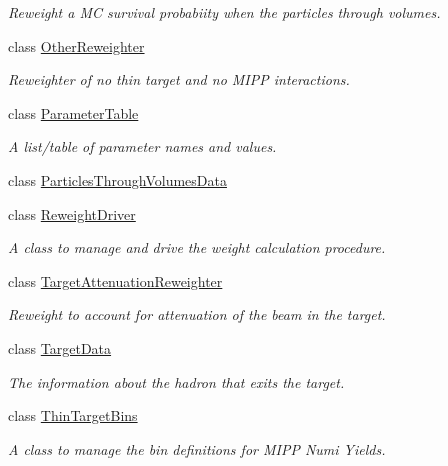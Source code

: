 \begin{DoxyCompactItemize}
\begin{DoxyCompactList}\small\item\em Reweight a M\-C survival probabiity when the particles through volumes. \end{DoxyCompactList}\item 
class \hyperlink{class_neutrino_flux_reweight_1_1_other_reweighter}{Other\-Reweighter}
\begin{DoxyCompactList}\small\item\em Reweighter of no thin target and no M\-I\-P\-P interactions. \end{DoxyCompactList}\item 
class \hyperlink{class_neutrino_flux_reweight_1_1_parameter_table}{Parameter\-Table}
\begin{DoxyCompactList}\small\item\em A list/table of parameter names and values. \end{DoxyCompactList}\item 
class \hyperlink{class_neutrino_flux_reweight_1_1_particles_through_volumes_data}{Particles\-Through\-Volumes\-Data}
\item 
class \hyperlink{class_neutrino_flux_reweight_1_1_reweight_driver}{Reweight\-Driver}
\begin{DoxyCompactList}\small\item\em A class to manage and drive the weight calculation procedure. \end{DoxyCompactList}\item 
class \hyperlink{class_neutrino_flux_reweight_1_1_target_attenuation_reweighter}{Target\-Attenuation\-Reweighter}
\begin{DoxyCompactList}\small\item\em Reweight to account for attenuation of the beam in the target. \end{DoxyCompactList}\item 
class \hyperlink{class_neutrino_flux_reweight_1_1_target_data}{Target\-Data}
\begin{DoxyCompactList}\small\item\em The information about the hadron that exits the target. \end{DoxyCompactList}\item 
class \hyperlink{class_neutrino_flux_reweight_1_1_thin_target_bins}{Thin\-Target\-Bins}
\begin{DoxyCompactList}\small\item\em A class to manage the bin definitions for M\-I\-P\-P Numi Yields. \end{DoxyCompactList}\item 

\end{DoxyCompactItemize}
